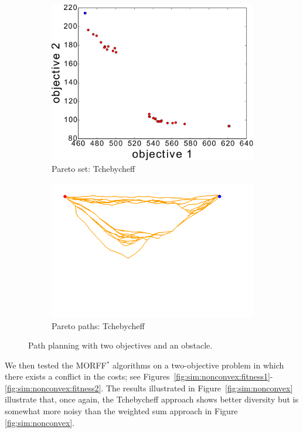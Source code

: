 \documentclass{article}
\begin{document}
\begin{figure}
\begin{subfigure}[b]{0.45\linewidth}
		\includegraphics[width=\textwidth]{fig/sim5-obstacle/PF05-MORRT2.pdf}
		\caption{Pareto set: Tchebycheff}
		\label{fig:sim:obs:pf:b}
	\end{subfigure} 
	\begin{subfigure}[b]{0.45\linewidth}
		\centering
		\includegraphics[width=\textwidth]{fig/sim5-obstacle/MORRTstar01-1-ALL.png}
		\caption{Pareto paths: Tchebycheff}
		\label{fig:sim:obs:sols:b}
	\end{subfigure}
	\caption{Path planning with two objectives and an obstacle.}
	\label{fig:sim:obs}
\end{figure}

We then tested the MORFF$^{*}$ algorithms on a two-objective problem  in which there exists a conflict in the costs; 
see Figures~\ref{fig:sim:nonconvex:fitness1}-\ref{fig:sim:nonconvex:fitness2}. 
The results illustrated in Figure~\ref{fig:sim:nonconvex} illustrate that, once again, the Tchebycheff approach shows better diversity but is somewhat more noisy than the weighted sum approach in Figure \ref{fig:sim:nonconvex}.
\end{document}
